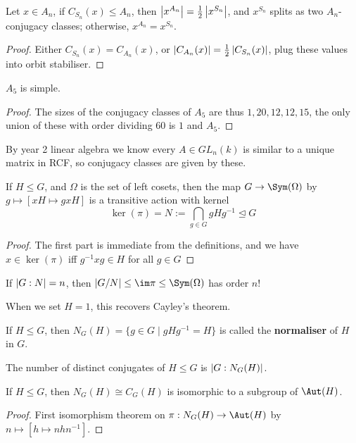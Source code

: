 \documentclass{article}
\begin{document}
\begin{proposition}
    Let $x\in A_n$, if $C_{S_n}(x)\leq A_n$, then $\left| x^{A_n} \right| = \frac{1}{2}\left| x^{S_n} \right|$, and $x^{S_n}$ splits as two $A_n$-conjugacy classes; otherwise, $x^{A_n}=x^{S_n}$.
    \begin{proof}
        Either $C_{S_n}(x) = C_{A_n}(x)$, or $\left| C_{A_n}(x) \right| = \frac{1}{2}\left| C_{S_n}(x) \right|$, plug these values into orbit stabiliser.
    \end{proof}
\end{proposition}

\begin{corollary}
    $A_5$ is simple.
    \begin{proof}
        The sizes of the conjugacy classes of $A_5$ are thus $1,20,12,12,15$, the only union of these with order dividing $60$ is $1$ and $A_5$.
    \end{proof}
\end{corollary}

By year 2 linear algebra we know every $A\in GL_n(k)$ is similar to a unique matrix in RCF, so conjugacy classes are given by these.

\begin{proposition}
    If $H\leq G$, and $\Omega$ is the set of left cosets, then the map $G\rightarrow \Sym(\Omega)$ by $g\mapsto [xH\mapsto gxH]$ is a transitive action with kernel \[
    \ker(\pi) = N := \bigcap_{g\in G}gHg^{-1}\unlhd G
    \]\begin{proof}
        The first part is immediate from the definitions, and we have $x\in \ker(\pi)$ iff $g^{-1}xg\in H$ for all $g\in G$
    \end{proof}
\end{proposition}

\begin{corollary}
    If $\left| G:N \right|=n$, then $\abs{G/N}\leq \im\pi\leq \Sym(\Omega)$ has order $n!$
\end{corollary}

When we set $H=1$, this recovers Cayley's theorem.

\begin{definition}
    If $H\leq G$, then $N_G(H) = \{g\in G \mid gHg^{-1} = H\}$ is called the \textbf{normaliser} of $H$ in $G$.
\end{definition}

The number of distinct conjugates of $H\leq G$ is $\left| G:N_G(H) \right|$.
\begin{proposition}
    If $H\leq G$, then $N_G(H)\cong C_G(H)$ is isomorphic to a subgroup of $\Aut(H)$.\begin{proof}
        First isomorphism theorem on $\pi:N_G(H)\rightarrow \Aut(H)$ by $n\mapsto [h\mapsto nhn^{-1}]$.
    \end{proof}
\end{proposition}
\end{document}
